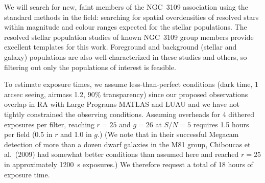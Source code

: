 We will search for new, faint members of the NGC~3109 association using the standard methods in the field:
searching for spatial overdensities of resolved stars within magnitude and colour ranges expected for the stellar populations.
The resolved stellar population studies of known NGC~3109 group members provide excellent templates for
this work. Foreground and background (stellar and galaxy) populations are also well-characterized in these
studies and others, so filtering out only the populations of interest is feasible.

To estimate exposure times, we assume less-than-perfect conditions (dark time, 1 arcsec seeing, airmass 1.2, 90\% transparency)
since our proposed observations  overlap in RA with Large Programs MATLAS and LUAU and we have not
tightly constrained the observing
conditions. Assuming overheads for 4 dithered exposures per filter, reaching 
$r=25$ and $g=26$ at $S/N=5$ requires 1.5 hours per field (0.5 in $r$ and 1.0 in $g$.)
(We note that in their successful Megacam detection of more than a 
dozen dwarf galaxies in the M81 group, Chiboucas et al.\ (2009) had somewhat
better conditions than assumed here and reached $r=25$ in approximately 1200~s exposures.)
We therefore request a total of 18 hours of exposure time.


